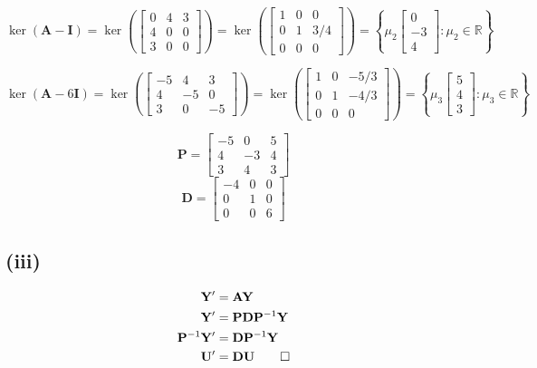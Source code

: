 \documentclass[a4paper]{article}
\newcommand{\vv}{\mathbf}
\begin{document}
\[\ker(\vv A-\vv I)=\ker\left(\begin{bmatrix}
		0&4&3\\
		4&0&0\\
		3&0&0
		\end{bmatrix}\right)=\ker\left(\begin{bmatrix}
		1&0&0\\
		0&1&3/4\\
		0&0&0
	\end{bmatrix}\right)=\left\{\mu_2\begin{bmatrix}0\\-3\\4\end{bmatrix}:\mu_2\in\mathbb R\right\}\]

\[\ker(\vv A-6\vv I)=\ker\left(\begin{bmatrix}
		-5&4&3\\
		4&-5&0\\
		3&0&-5
		\end{bmatrix}\right)=\ker\left(\begin{bmatrix}
		1&0&-5/3\\
		0&1&-4/3\\
		0&0&0
	\end{bmatrix}\right)=\left\{\mu_3\begin{bmatrix}5\\4\\3\end{bmatrix}:\mu_3\in\mathbb R\right\}\]

\[\vv P=\boxed{\begin{bmatrix}-5&0&5\\4&-3&4\\3&4&3\end{bmatrix}}\]
\[\vv D=\boxed{\begin{bmatrix}-4&0&0\\0&1&0\\0&0&6\end{bmatrix}}\]

\subsection*{(iii)}
\[\begin{aligned}
	\vv Y^\prime&=\vv A\vv Y\\
	\vv Y^\prime&=\vv P\vv D\vv P^{-1}\vv Y\\
	\vv P^{-1}\vv Y^\prime&=\vv D\vv P^{-1}\vv Y\\
	\vv U^\prime&=\vv D\vv U\qed
\end{aligned}\]
\end{document}
